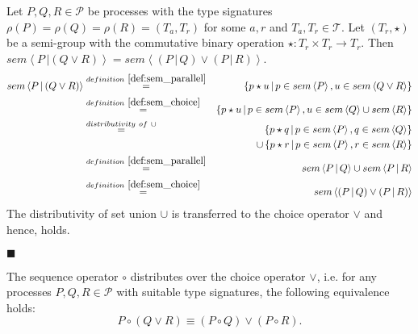 \begin{myproof}
Let $P, Q, R \in \mathcal{P}$ be processes with the type signatures $\rho \left( P \right) = \rho \left( Q \right) = \rho \left( R \right) = \left( T_a, T_r \right)$ for some $a, r$ and $T_a, T_r \in \mathcal{T}$. Let $\left( T_r, \star \right)$ be a semi-group with the commutative binary operation $\star \colon T_r \times T_r \to T_r$. Then $sem \left\langle P \,| \left( Q \vee R \right) \right\rangle = sem \left\langle \left( P \,|\, Q \right) \vee \left( P \,|\, R \right) \right\rangle$.
\begin{eqnarray*}
  sem \left\langle P \,| \left( Q \vee R \right) \right\rangle & \overset{\defref{def:sem_parallel}}{=} & \left\{ p \star u \,|\, p \in sem \left\langle P \right\rangle, u \in sem \left\langle Q \vee R \right\rangle \right\} \\
  & \overset{\defref{def:sem_choice}}{=} & \left\{ p \star u \,|\, p \in sem \left\langle P \right\rangle, u \in sem \left\langle Q \right\rangle \cup sem \left\langle R \right\rangle \right\} \\
  & \overset{distributivity \ of \ \cup}{=} & \hspace*{0.8em} \left\{ p \star q \,|\, p \in sem \left\langle P \right\rangle, q \in sem \left\langle Q \right\rangle \right\} \\
  & & \cup \left\{ p \star r \,|\, p \in sem \left\langle P \right\rangle, r \in sem \left\langle R \right\rangle \right\} \\
  & \overset{\defref{def:sem_parallel}}{=} & sem \left\langle P \,|\, Q \right\rangle \cup sem \left\langle P \,|\, R \right\rangle \\
  & \overset{\defref{def:sem_choice}}{=} & sem \left\langle \left( P \,|\, Q \right) \vee \left( P \,|\, R \right) \right\rangle
\end{eqnarray*}
The distributivity of set union $\cup$ is transferred to the choice operator $\vee$ and hence,  holds.

\hfill$\blacksquare$
\end{myproof}

\begin{theorem}
\label{thm:distributivity_sequence_choice}
The sequence operator $\circ$ distributes over the choice operator $\vee$, i.e. for any processes $P, Q, R \in \mathcal{P}$ with suitable type signatures, the following equivalence holds:
\begin{equation*}
  P \circ \left( Q \vee R \right) \equiv \left( P \circ Q \right) \vee \left( P \circ R \right).
\end{equation*}
\end{theorem}

